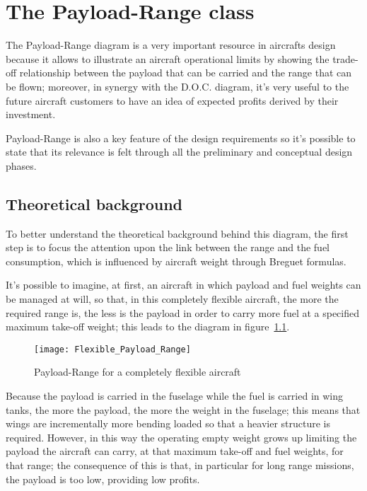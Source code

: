 \chapter{The Payload-Range class}
The Payload-Range diagram is a very important resource in aircrafts design because it allows to illustrate an aircraft operational limits by showing the trade-off relationship between the payload that can be carried and the range that can be flown; moreover, in synergy with the D.O.C. diagram, it’s very useful to the future aircraft customers to have an idea of expected profits derived by their investment.

Payload-Range is also a key feature of the design requirements so it’s possible to state that its relevance is felt through all the preliminary and conceptual design phases.

\section{Theoretical background}
To better understand the theoretical background behind this diagram, the first step is to focus the attention upon the link between the range and the fuel consumption, which is influenced by aircraft weight through Breguet formulas. 

It’s possible to imagine, at first, an aircraft in which payload and fuel weights can be managed at will, so that, in this completely flexible aircraft, the more the required range is, the less is the payload in order to carry more fuel at a specified maximum take-off weight; this leads to the diagram in figure~\ref{fig:Figure1}.

\begin{figure}[ht]
\centering
\texttt{[image: Flexible\_Payload\_Range]}
\caption{Payload-Range for a completely flexible aircraft}
\label{fig:Figure1}
\end{figure}

Because the payload is carried in the fuselage while the fuel is carried in wing tanks, the more the payload, the more the weight in the fuselage; this means that wings are incrementally more bending loaded so that a heavier structure is required. However, in this way the operating empty weight grows up limiting the payload the aircraft can carry, at that maximum take-off and fuel weights, for that range; the consequence of this is that, in particular for long range missions, the payload is too low, providing low profits.

